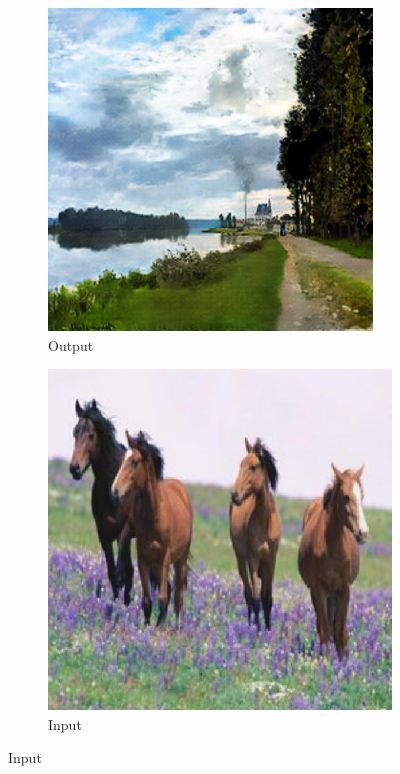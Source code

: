 \begin{figure}
\begin{subfigure}[t]{.14\textwidth}
  \end{subfigure}
  \begin{subfigure}[t]{.14\textwidth}
    \caption*{Output}
    \centering
    \includegraphics[width=\linewidth]{images/cycleGanResults/monet_output1.png}
  \end{subfigure}
  \hfill
  \begin{subfigure}[t]{.14\textwidth}
    \caption*{Input}
    \centering
    \includegraphics[width=\linewidth]{images/cycleGanResults/horse_input1.png}

\end{subfigure}
\end{figure}
